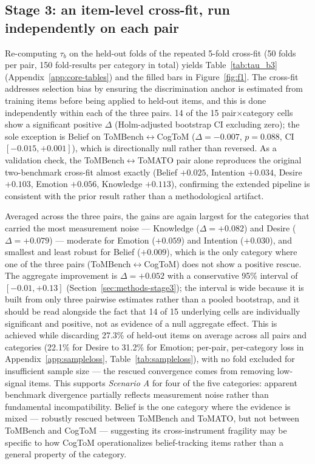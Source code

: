 \documentclass{article} %
\begin{document}
\subsection{Stage 3: an item-level cross-fit, run independently on each pair}
\label{sec:results-stage3}

Re-computing $\tau_b$ on the held-out folds of the repeated 5-fold cross-fit (50 folds per pair, 150 fold-results per category in total) yields Table~\ref{tab:tau_b3} (Appendix~\ref{app:core-tables}) and the filled bars in Figure~\ref{fig:f1}. The cross-fit addresses selection bias by ensuring the discrimination anchor is estimated from training items before being applied to held-out items, and this is done independently within each of the three pairs. 14 of the 15 pair$\times$category cells show a significant positive $\Delta$ (Holm-adjusted bootstrap CI excluding zero); the sole exception is Belief on ToMBench$\leftrightarrow$CogToM ($\Delta=-0.007$, $p=0.088$, CI $[-0.015,+0.001]$), which is directionally null rather than reversed. As a validation check, the ToMBench$\leftrightarrow$ToMATO pair alone reproduces the original two-benchmark cross-fit almost exactly (Belief $+0.025$, Intention $+0.034$, Desire $+0.103$, Emotion $+0.056$, Knowledge $+0.113$), confirming the extended pipeline is consistent with the prior result rather than a methodological artifact.

Averaged across the three pairs, the gains are again largest for the categories that carried the most measurement noise --- Knowledge ($\Delta{=}{+}0.082$) and Desire ($\Delta{=}{+}0.079$) --- moderate for Emotion ($+0.059$) and Intention ($+0.030$), and smallest and least robust for Belief ($+0.009$), which is the only category where one of the three pairs (ToMBench$\leftrightarrow$CogToM) does not show a positive rescue. The aggregate improvement is $\Delta{=}{+}0.052$ with a conservative 95\% interval of $[-0.01,+0.13]$ (Section~\ref{sec:methods-stage3}); the interval is wide because it is built from only three pairwise estimates rather than a pooled bootstrap, and it should be read alongside the fact that 14 of 15 underlying cells are individually significant and positive, not as evidence of a null aggregate effect. This is achieved while discarding 27.3\% of held-out items on average across all pairs and categories (22.1\% for Desire to 31.2\% for Emotion; per-pair, per-category loss in Appendix~\ref{app:sampleloss}, Table~\ref{tab:sampleloss}), with no fold excluded for insufficient sample size --- the rescued convergence comes from removing low-signal items. This supports \emph{Scenario A} for four of the five categories: apparent benchmark divergence partially reflects measurement noise rather than fundamental incompatibility. Belief is the one category where the evidence is mixed --- robustly rescued between ToMBench and ToMATO, but not between ToMBench and CogToM --- suggesting its cross-instrument fragility may be specific to how CogToM operationalizes belief-tracking items rather than a general property of the category.
\end{document}
